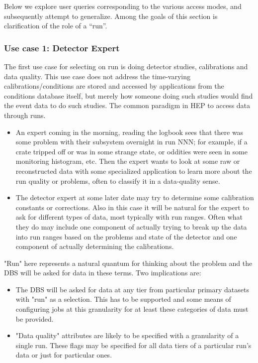 \documentclass{cmspaper}
\begin{document}
Below we explore user queries corresponding to the various access modes,
and subsequently attempt to generalize. Among the goals of this section
is clarification of the role of a ``run''.

\subsubsection{Use case 1: Detector Expert}

  The first use case for selecting on run is doing detector studies, calibrations
and data quality. This use case does not address the time-varying 
calibrations/conditions are stored and accessed by applications from the 
conditions database itself, but merely how someone doing such studies would 
find the event data to do such studies. The common paradigm in HEP to access 
data through runs.
\begin{itemize}
\item An expert coming in the morning, reading the logbook sees that there was
     some problem with their subsystem overnight in run NNN; for example, if a crate 
     tripped off or was in some strange state, or oddities were seen in some 
     monitoring histogram, etc. Then the expert wants to look at some raw or 
     reconstructed data with some specialized application to learn more about the
     run quality or problems, often to classify it in a data-quality sense.
\item The detector expert at some later date may try to determine
     some calibration constants or corrections. Also in this case it will be natural
     for the expert to ask for different types of data, most typically with
     run ranges. Often what they do may include one component of actually 
     trying to break up the data into run ranges based on the problems and
     state of the detector and one component of actually determining the
     calibrations. 
\end{itemize}

"Run" here represents a natural quantum for thinking about the problem and
the DBS will be asked for data in these terms. Two implications are:
\begin{itemize}
\item The DBS will be asked for data at any tier from particular
    primary datasets with "run" as a selection. This has to be supported and
    some means of configuring jobs at this granularity for at least these
    categories of data must be provided.
\item "Data quality" attributes are likely 
    to be specified with a granularity of a single run. These flags may be
    specified for all data tiers of a particular run's data or just
    for particular ones. 
\end{itemize}
\end{document}
